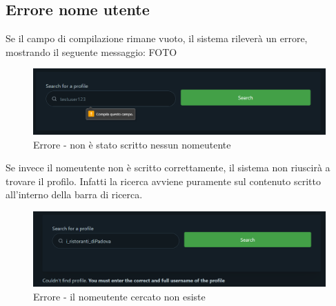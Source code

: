{    \subsection{Errore nome utente} {
        Se il campo di compilazione rimane vuoto, il sistema rileverà un errore, mostrando il seguente messaggio: FOTO
        \begin{figure}[H]
            \includegraphics[width=12cm]{sezioni/images/err1-add.png}
            \centering
            \caption{Errore - non è stato scritto nessun nomeutente}
        \end{figure}
        Se invece il nomeutente non è scritto correttamente, il sistema non riuscirà a trovare il profilo. Infatti la ricerca avviene puramente sul contenuto scritto all'interno della barra di ricerca.
        \begin{figure}[H]
            \includegraphics[width=12cm]{sezioni/images/err2-add.png}
            \centering
            \caption{Errore - il nomeutente cercato non esiste}
        \end{figure}
    }
}
